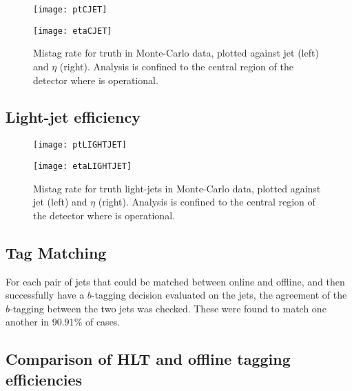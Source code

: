 		\begin{figure}[h]
			\centering
			\begin{minipage}[h]{0.45\linewidth}
				\texttt{[image: ptCJET]}

			\end{minipage}
			\quad
			\begin{minipage}[h]{0.45\linewidth}
				\texttt{[image: etaCJET]}
			\end{minipage}
			\caption{Mistag rate for truth \bjets in Monte-Carlo data, plotted against jet \pt (left) and $\eta$ (right). Analysis is confined to the central region of the detector where \btagging is operational.}
			\label{fig:MC:cjetefficiency}
		\end{figure}

	\subsection{Light-jet efficiency}

		\begin{figure}[h]
			\centering
			\begin{minipage}[h]{0.45\linewidth}
				\texttt{[image: ptLIGHTJET]}

			\end{minipage}
			\quad
			\begin{minipage}[h]{0.45\linewidth}
				\texttt{[image: etaLIGHTJET]}
			\end{minipage}
			\caption{Mistag rate for truth light-jets in Monte-Carlo data, plotted against jet \pt (left) and $\eta$ (right). Analysis is confined to the central region of the detector where \btagging is operational.}
			\label{fig:MC:lightjetefficiency}
		\end{figure}


	\subsection{Tag Matching}

	For each pair of jets that could be matched between online and offline, and then successfully have a $b$-tagging decision evaluated on the jets, the agreement of the $b$-tagging between the two jets was checked. These were found to match one another in $90.91\%$ of cases.

	\subsection{Comparison of HLT and offline tagging efficiencies}

